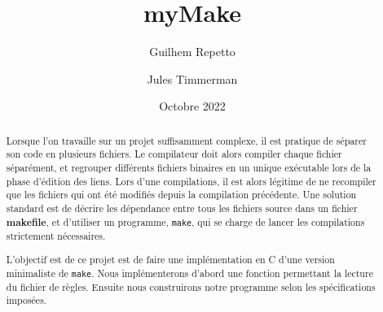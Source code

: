 \documentclass[11pt]{article}
\title{myMake}
\date{Octobre 2022}
\author{Guilhem Repetto \and Jules Timmerman}
\begin{document}
\maketitle

\begin{abstract}
Lorsque l'on travaille sur un projet suffisamment complexe, il est pratique de séparer son code en plusieurs fichiers. Le compilateur doit alors compiler chaque fichier séparément, et regrouper différents fichiers binaires en un unique exécutable lors de la phase d'édition des liens. Lors d'une compilations, il est alors légitime de ne recompiler que les fichiers qui ont été modifiés depuis la compilation précédente. Une solution standard est de décrire les dépendance entre tous les fichiers source dans un fichier \textbf{makefile}, et d'utiliser un programme, \texttt{make}, qui se charge de lancer les compilations strictement nécessaires.

L'objectif est de ce projet est de faire une implémentation en C d'une version minimaliste de \texttt{make}. Nous implémenterons d'abord une fonction permettant la lecture du fichier de règles. Ensuite nous construirons notre programme selon les spécifications imposées.

\end{abstract}
\end{document}
